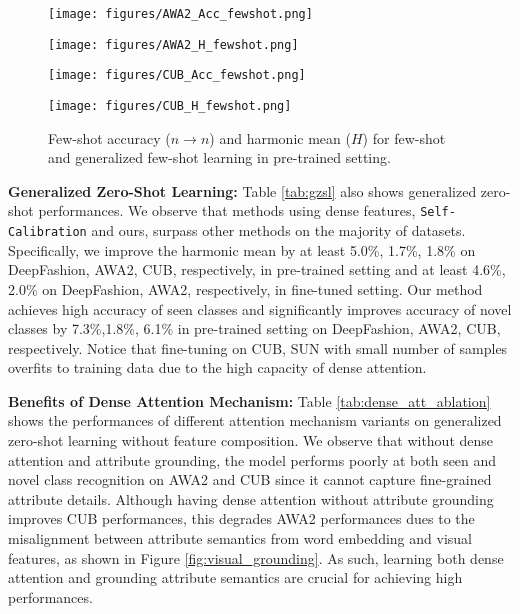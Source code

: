 \documentclass[10pt,journal,compsoc]{IEEEtran}
\newcommand{\1}{\boldsymbol{1}}
\newcommand{\0}{\boldsymbol{0}}
\newcommand{\<}{\langle}
\renewcommand{\>}{\rangle}
\newcommand{\myparagraph}[1]{\vspace{-2pt}\medskip\noindent\textbf{#1}}
\begin{document}
\begin{figure*} 
\centering
\begin{minipage}[b]{0.24\linewidth}
  \texttt{[image: figures/AWA2\_Acc\_fewshot.png]}
  \vspace{-1mm}
\end{minipage}
\begin{minipage}[b]{0.24\linewidth}
  \texttt{[image: figures/AWA2\_H\_fewshot.png]}
    \vspace{-5mm}
\vspace{4mm}
\end{minipage}
\begin{minipage}[b]{0.24\linewidth}
  \texttt{[image: figures/CUB\_Acc\_fewshot.png]}
    \vspace{-5mm}
\vspace{4mm}
\end{minipage}
\begin{minipage}[b]{0.24\linewidth}
  \texttt{[image: figures/CUB\_H\_fewshot.png]}
    \vspace{-5mm}
\vspace{4mm}
\end{minipage}
\vspace{-3.5mm}
\caption{
\small{
Few-shot accuracy ($n\rightarrow n$) and harmonic mean ($H$) for few-shot and generalized few-shot learning in pre-trained setting.
}
\vspace{-5mm}
}
\label{fig:few_shot_performance}
\end{figure*}

\myparagraph{Generalized Zero-Shot Learning:}
Table \ref{tab:gzsl} also shows generalized zero-shot performances. 
We observe that methods using dense features, \texttt{Self-Calibration} and ours, surpass other methods on the majority of datasets.
Specifically, we improve the harmonic mean by at least 5.0\%, 1.7\%, 1.8\% on DeepFashion, AWA2, CUB, respectively, in pre-trained setting and at least 4.6\%, 2.0\% on DeepFashion, AWA2, respectively, in fine-tuned setting.
Our method achieves high accuracy of seen classes and significantly improves accuracy of novel classes by 7.3\%,1.8\%, 6.1\% in pre-trained setting on DeepFashion, AWA2, CUB, respectively.
Notice that fine-tuning on CUB, SUN with small number of samples overfits to training data due to the high capacity of dense attention.

\myparagraph{Benefits of Dense Attention Mechanism:}
Table \ref{tab:dense_att_ablation} shows the performances of different attention mechanism variants on generalized zero-shot learning without feature composition.
We observe that without dense attention and attribute grounding, the model performs poorly at both seen and novel class recognition on AWA2 and CUB since it cannot capture fine-grained attribute details.
Although having dense attention without attribute grounding improves CUB performances, this degrades AWA2 performances dues to the misalignment between attribute semantics from word embedding and visual features, as shown in Figure \ref{fig:visual_grounding}.
As such, learning both dense attention and grounding attribute semantics are crucial for achieving high performances. 
\end{document}
